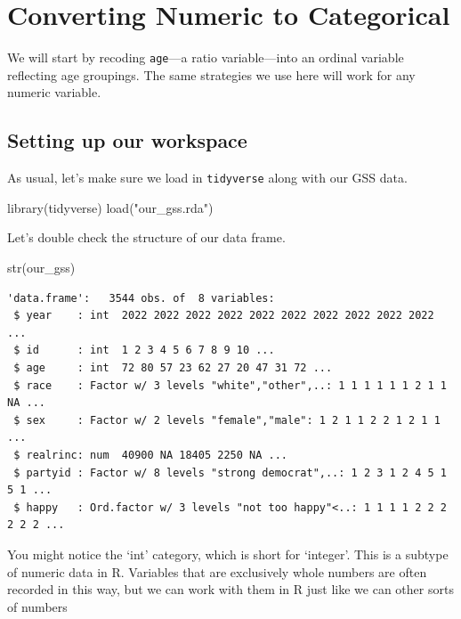 \documentclass[
  letterpaper,
  DIV=11,
  numbers=noendperiod]{scrreprt}
\newenvironment{Shaded}{\begin{snugshade}}{\end{snugshade}}
\newcommand{\FunctionTok}[1]{\textcolor[rgb]{0.28,0.35,0.67}{#1}}
\newcommand{\NormalTok}[1]{\textcolor[rgb]{0.00,0.23,0.31}{#1}}
\newcommand{\StringTok}[1]{\textcolor[rgb]{0.13,0.47,0.30}{#1}}
\begin{document}
\section{Converting Numeric to
Categorical}\label{converting-numeric-to-categorical}

We will start by recoding \texttt{age}---a ratio variable---into an
ordinal variable reflecting age groupings. The same strategies we use
here will work for any numeric variable.

\subsection{Setting up our workspace}\label{setting-up-our-workspace}

As usual, let's make sure we load in \texttt{tidyverse} along with our
GSS data.

\begin{Shaded}
\begin{Highlighting}[]
\FunctionTok{library}\NormalTok{(tidyverse)}
\FunctionTok{load}\NormalTok{(}\StringTok{"our\_gss.rda"}\NormalTok{)}
\end{Highlighting}
\end{Shaded}

Let's double check the structure of our data frame.

\begin{Shaded}
\begin{Highlighting}[]
\FunctionTok{str}\NormalTok{(our\_gss)}
\end{Highlighting}
\end{Shaded}

\begin{verbatim}
'data.frame':   3544 obs. of  8 variables:
 $ year    : int  2022 2022 2022 2022 2022 2022 2022 2022 2022 2022 ...
 $ id      : int  1 2 3 4 5 6 7 8 9 10 ...
 $ age     : int  72 80 57 23 62 27 20 47 31 72 ...
 $ race    : Factor w/ 3 levels "white","other",..: 1 1 1 1 1 1 2 1 1 NA ...
 $ sex     : Factor w/ 2 levels "female","male": 1 2 1 1 2 2 1 2 1 1 ...
 $ realrinc: num  40900 NA 18405 2250 NA ...
 $ partyid : Factor w/ 8 levels "strong democrat",..: 1 2 3 1 2 4 5 1 5 1 ...
 $ happy   : Ord.factor w/ 3 levels "not too happy"<..: 1 1 1 1 2 2 2 2 2 2 ...
\end{verbatim}

\begin{tcolorbox}[enhanced jigsaw, colframe=quarto-callout-note-color-frame, arc=.35mm, coltitle=black, breakable, rightrule=.15mm, left=2mm, opacitybacktitle=0.6, colbacktitle=quarto-callout-note-color!10!white, toptitle=1mm, bottomtitle=1mm, titlerule=0mm, leftrule=.75mm, colback=white, title=\textcolor{quarto-callout-note-color}{\faInfo}\hspace{0.5em}{Note}, opacityback=0, bottomrule=.15mm, toprule=.15mm]

You might notice the `int' category, which is short for `integer'. This
is a subtype of numeric data in R. Variables that are exclusively whole
numbers are often recorded in this way, but we can work with them in R
just like we can other sorts of numbers

\end{tcolorbox}
\end{document}
